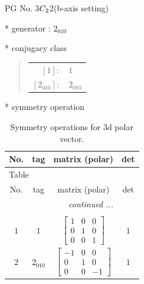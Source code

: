 \documentclass[fleqn,8pt]{jsarticle}
\begin{document}
\setcounter{MaxMatrixCols}{32}

\renewcommand{\tablename}{Table~}
\renewcommand{\figurename}{Figure~}
\begin{center}
\LARGE
PG No. 3\quad$C_{\rm 2}$\quad$2$\quad(b-axis setting)\quad[ monoclinic ]
\end{center}

* generator : $2{}_{010}$

* conjugacy class
\begin{quote}
\begin{tabular}{rl}
$ [1]: $ & $ 1 $ \\
$ [2{}_{010}]: $ & $ 2{}_{010} $
\end{tabular}
\end{quote}

* symmetry operation
\renewcommand{\arraystretch}{1.3}
\begin{longtable}{cccc}
\caption{Symmetry operations for 3d polar vector.}
 \\
 \hline \hline
No. & tag & matrix (polar) & det \\ \hline \endfirsthead

\multicolumn{3}{l}{\tablename\ \thetable{}} \\
 \hline \hline
No. & tag & matrix (polar) & det \\ \hline \endhead

 \hline \hline
\multicolumn{3}{r}{\footnotesize\it continued ...} \\ \endfoot

 \hline \hline
\multicolumn{3}{r}{} \\ \endlastfoot

$ 1 $ & $ 1 $ & $ \begin{bmatrix} 1 & 0 & 0 \\ 0 & 1 & 0 \\ 0 & 0 & 1 \end{bmatrix} $ & $ 1 $ \\ \hline
$ 2 $ & $ 2{}_{010} $ & $ \begin{bmatrix} -1 & 0 & 0 \\ 0 & 1 & 0 \\ 0 & 0 & -1 \end{bmatrix} $ & $ 1 $ \\
\end{longtable}
\end{document}
